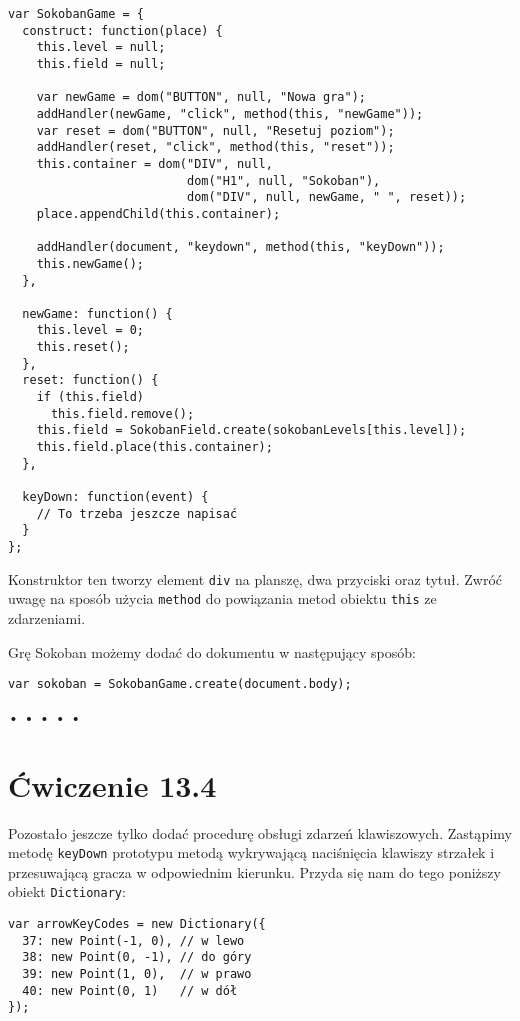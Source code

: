   
\begin{verbatim} 
var SokobanGame = {
  construct: function(place) {
    this.level = null;
    this.field = null;

    var newGame = dom("BUTTON", null, "Nowa gra");
    addHandler(newGame, "click", method(this, "newGame"));
    var reset = dom("BUTTON", null, "Resetuj poziom");
    addHandler(reset, "click", method(this, "reset"));
    this.container = dom("DIV", null,
                         dom("H1", null, "Sokoban"),
                         dom("DIV", null, newGame, " ", reset));
    place.appendChild(this.container);

    addHandler(document, "keydown", method(this, "keyDown"));
    this.newGame();
  },

  newGame: function() {
    this.level = 0;
    this.reset();
  },
  reset: function() {
    if (this.field)
      this.field.remove();
    this.field = SokobanField.create(sokobanLevels[this.level]);
    this.field.place(this.container);
  },

  keyDown: function(event) {
    // To trzeba jeszcze napisać
  }
};
 \end{verbatim}
  
Konstruktor ten tworzy element \texttt{div} na planszę, dwa przyciski oraz tytuł. Zwróć uwagę na sposób użycia \texttt{method} do powiązania metod obiektu \texttt{this} ze zdarzeniami.

  
Grę Sokoban możemy dodać do dokumentu w następujący sposób:

  
\begin{verbatim} 
var sokoban = SokobanGame.create(document.body);
 \end{verbatim}


\begin{center}
• • • • •
\end{center}

  
\section*{Ćwiczenie 13.4}
\label{sec:13.4}
  
    
Pozostało jeszcze tylko dodać procedurę obsługi zdarzeń klawiszowych. Zastąpimy metodę \texttt{keyDown} prototypu metodą wykrywającą naciśnięcia klawiszy strzałek i przesuwającą gracza w odpowiednim kierunku. Przyda się nam do tego poniższy obiekt \texttt{Dictionary}:

    
\begin{verbatim} 
var arrowKeyCodes = new Dictionary({
  37: new Point(-1, 0), // w lewo
  38: new Point(0, -1), // do góry
  39: new Point(1, 0),  // w prawo
  40: new Point(0, 1)   // w dół
});
 \end{verbatim}
    
